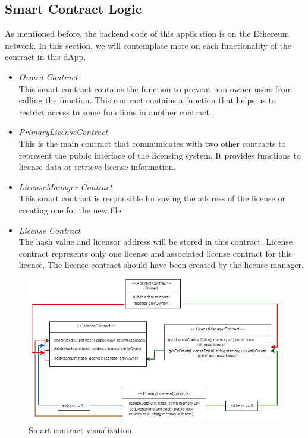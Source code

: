 \subsection{Smart Contract Logic}
As mentioned before, the backend code of this application is on the Ethereum network. In this section, we will contemplate more on each functionality of the contract in this dApp.
\begin{itemize}
	\item \textit{Owned Contract} \\
	This smart contract contains the function to prevent non-owner users from calling the function. This contract contains a function that helps us to restrict access to some functions in another contract. \\
	\item \textit{PrimaryLicenseContract} \\
	This is the main contract that communicates with two other contracts to represent the public interface of the licensing system. It provides functions to license data or retrieve license information. \\
   \item \textit{LicenseManager Contract} \\
	This smart contract is responsible for saving the address of the license or creating one for the new file. \\
	\item \textit{License Contract} \\
	The hash value and licensor address will be stored in this contract. License contract represents only one license and associated license contract for this license. The license contract should have been created by the license manager.
\end{itemize}

\begin{center}
	
	\begin{figure}[htb!]
		
		\begin{minipage}{0.75\linewidth}
			
			\includegraphics[width=1.45\textwidth]{images/chap03_smartContract_visual.png}
		\end{minipage}
		\caption{Smart contract visualization}
		
	\end{figure}
	
\end{center}


